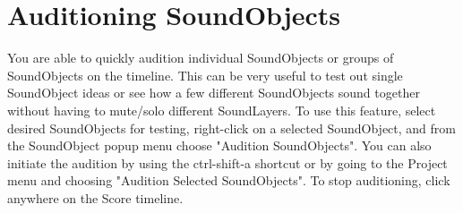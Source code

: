 \section{Auditioning SoundObjects}\label{auditionSoundObjects}

You are able to quickly audition individual SoundObjects or groups of
SoundObjects on the timeline. This can be very useful to test out single
SoundObject ideas or see how a few different SoundObjects sound together
without having to mute/solo different SoundLayers. To use this feature,
select desired SoundObjects for testing, right-click on a selected
SoundObject, and from the SoundObject popup menu choose "Audition
SoundObjects". You can also initiate the audition by using the
ctrl-shift-a shortcut or by going to the Project menu and choosing
"Audition Selected SoundObjects". To stop auditioning, click anywhere on
the Score timeline.
